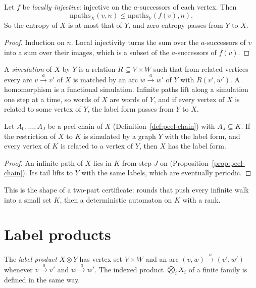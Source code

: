 \begin{proposition}\label{prop:locinj}
Let \(f\) be \emph{locally injective}: injective on the \(a\)-successors of each vertex. Then
\[
\mathrm{npaths}_X(v,n)\le\mathrm{npaths}_Y(f(v),n).
\]
So the entropy of \(X\) is at most
that of \(Y\), and zero entropy passes from \(Y\) to \(X\).
\end{proposition}

\begin{proof}
Induction on \(n\). Local injectivity turns the sum over the \(a\)-successors of \(v\) into a sum
over their images, which is a subset of the \(a\)-successors of \(f(v)\).
\end{proof}

A \emph{simulation} of \(X\) by \(Y\) is a relation \(R\subseteq V\times W\) such that from
related vertices every arc \(v\xrightarrow{a}v'\) of \(X\) is matched by an arc
\(w\xrightarrow{a}w'\) of \(Y\) with \(R(v',w')\). A homomorphism is a functional simulation.
Infinite paths lift along a simulation one step at a time, so words of \(X\) are words of
\(Y\), and if every vertex of \(X\) is related to some vertex of \(Y\), the label form passes from
\(Y\) to \(X\).

\begin{theorem}\label{thm:peel-simulate}
Let \(A_0,\dots,A_J\) be a peel chain of \(X\) (Definition~\ref{def:peel-chain}) with
\(A_J\subseteq K\). If the restriction of \(X\) to \(K\) is simulated by a graph \(Y\) with the
label form, and every vertex of \(K\) is related to a vertex of \(Y\), then \(X\) has the label
form.
\end{theorem}

\begin{proof}
An infinite path of \(X\) lies in \(K\) from step \(J\) on
(Proposition~\ref{prop:peel-chain}). Its tail lifts to \(Y\) with the same labels, which are
eventually periodic.
\end{proof}

This is the shape of a two-part certificate: rounds that push every infinite walk into a small
set \(K\), then a deterministic automaton on \(K\) with a rank.

\section{Label products}

\begin{definition}\label{def:labelproduct}
The \emph{label product} \(X\otimes Y\) \cite[Def.~3.4.8]{LM95} has vertex set \(V\times W\)
and an arc \((v,w)\xrightarrow{a}(v',w')\) whenever \(v\xrightarrow{a}v'\) and
\(w\xrightarrow{a}w'\). The indexed product \(\bigotimes_i X_i\) of a finite family is defined
in the same way.
\end{definition}

